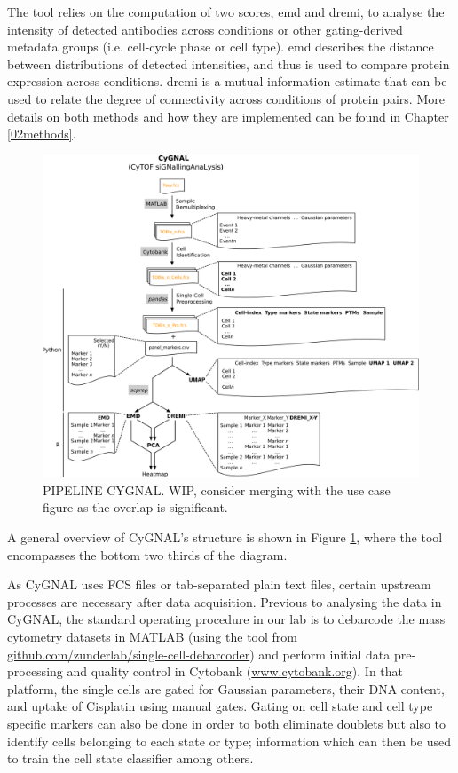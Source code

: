 The tool relies on the computation of two scores, \acrfull{emd} and \acrfull{dremi}, to analyse the intensity of detected antibodies across conditions or other gating-derived metadata groups (i.e. cell-cycle phase or cell type). \acrshort{emd} describes the distance between distributions of detected intensities, and thus is used to compare protein expression across conditions. \acrshort{dremi} is a mutual information estimate that can be used to relate the degree of connectivity across conditions of protein pairs. More details on both methods and how they are implemented can be found in Chapter \ref{02methods}.

\begin{figure}
    \centering
    \includegraphics{03cytof/figs/3CYGNAL_pipeline.png}
    \caption{PIPELINE CYGNAL. WIP, consider merging with the use case figure as the overlap is significant.}
    \label{fig:3cygpipe}
\end{figure}

A general overview of CyGNAL's structure is shown in Figure \ref{fig:3cygpipe}, where the tool encompasses the bottom two thirds of the diagram.

As CyGNAL uses FCS files or tab-separated plain text files, certain upstream processes are necessary after data acquisition. Previous to analysing the data in CyGNAL, the standard operating procedure in our lab is to debarcode the mass cytometry datasets in MATLAB (using the tool from \href{github.com/zunderlab/single-cell-debarcoder}{github.com/zunderlab/single-cell-debarcoder}) and perform initial data pre-processing and quality control in Cytobank (\href{www.cytobank.org}{www.cytobank.org}). In that platform, the single cells are gated for Gaussian parameters, their DNA content, and uptake of Cisplatin using manual gates. Gating on cell state and cell type specific markers can also be done in order to both eliminate doublets but also to identify cells belonging to each state or type; information which can then be used to train the cell state classifier among others.


